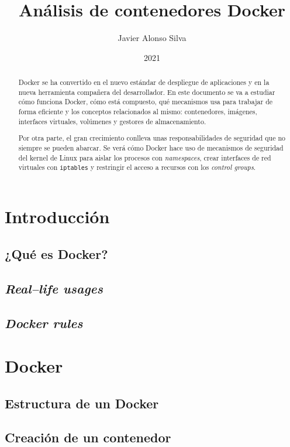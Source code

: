 \documentclass[a4paper,oneside,12pt]{article}
\author{Javier Alonso Silva}
\title{Análisis de contenedores Docker}
\date{2021}
\newcommand{\settttsize}[1]{\def\ttsize{#1}}%
\begin{document}
\settttsize{\footnotesize}
\ActivateVerbatimLigatures


\newpage
\begin{abstract}
  Docker se ha convertido en el nuevo estándar de despliegue de aplicaciones
  y en la nueva herramienta compañera del desarrollador. En este documento se
  va a estudiar cómo funciona Docker, cómo está compuesto, qué mecanismos usa
  para trabajar de forma eficiente y los conceptos relacionados al mismo:
  contenedores, imágenes, interfaces virtuales, volúmenes y gestores de
  almacenamiento.

  Por otra parte, el gran crecimiento conlleva unas responsabilidades de
  seguridad que no siempre se pueden abarcar. Se verá cómo Docker hace uso de
  mecanismos de seguridad del kernel de Linux para aislar los procesos con
  \textit{namespaces}, crear interfaces de red virtuales con \texttt{iptables}
  y restringir el acceso a recursos con los \textit{control groups}.
\end{abstract}

\newpage
\tableofcontents
\newpage
{}

\section{Introducción}

\subsection{¿Qué es Docker?}

\subsection{\textit{Real--life usages}}

\subsection{\textit{Docker rules}}


\section{Docker}

\subsection{Estructura de un Docker}

\subsection{Creación de un contenedor}

\end{document}
